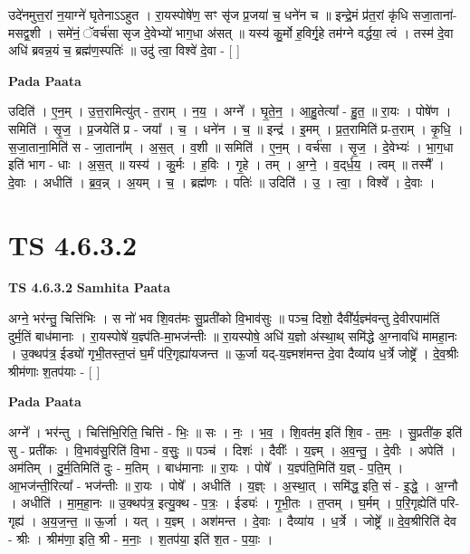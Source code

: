 \documentclass[17pt]{extarticle}
\begin{document}
उदे॑नमुत्त॒रां न॒याग्ने॑ घृतेनाऽऽहुत । रा॒यस्पोषे॑ण॒ सꣳ सृ॑ज प्र॒जया॑ च॒ धने॑न च ॥ इन्द्रे॒मं प्र॑त॒रां कृ॑धि सजा॒ताना॑-मसद्व॒शी । समे॑नं॒ ॅवर्च॑सा सृज दे॒वेभ्यो॑ भाग॒धा अ॑सत् ॥ यस्य॑ कु॒र्मो ह॒विर्गृ॒हे तम॑ग्ने वर्द्धया॒ त्वं । तस्म॑ दे॒वा अधि॑ ब्रवन्न॒यं च॒ ब्रह्म॑ण॒स्पतिः॑ ॥ उदु॑ त्वा॒ विश्वे॑ दे॒वा - [  ] \newline

\textbf{Pada Paata} \newline

उदिति॑ । ए॒न॒म् । उ॒त्त॒रामित्यु॑त् - त॒राम् । न॒य॒ । अग्ने᳚ । घृ॒ते॒न॒ । आ॒हु॒तेत्या᳚ - हु॒त॒ ॥ रा॒यः । पोषे॑ण । समिति॑ । सृ॒ज॒ । प्र॒जयेति॑ प्र - जया᳚ । च॒ । धने॑न । च॒ ॥ इन्द्र॑ । इ॒मम् । प्र॒त॒रामिति॑ प्र-त॒राम् । कृ॒धि॒ । स॒जा॒ताना॒मिति॑ स - जा॒ताना᳚म् । अ॒स॒त् । व॒शी ॥ समिति॑ । ए॒न॒म् । वर्च॑सा । सृ॒ज॒ । दे॒वेभ्यः॑ । भा॒ग॒धा इति॑ भाग - धाः । अ॒स॒त् ॥ यस्य॑ । कु॒र्मः । ह॒विः । गृ॒हे । तम् । अ॒ग्ने॒ । व॒द्‌र्ध॒य॒ । त्वम् ॥ तस्मै᳚ । दे॒वाः । अधीति॑ । ब्र॒व॒न्न् । अ॒यम् । च॒ । ब्रह्म॑णः । पतिः॑ ॥ उदिति॑ । उ॒ । त्वा॒ । विश्वे᳚ । दे॒वाः ।  \newline





\section{ TS 4.6.3.2 }

\textbf{TS 4.6.3.2 } \newline
\textbf{Samhita Paata} \newline

अग्ने॒ भर॑न्तु॒ चित्ति॑भिः । स नो॑ भव शि॒वत॑मः सु॒प्रती॑को वि॒भाव॑सुः ॥ पञ्च॒ दिशो॒ दैवी᳚र्य॒ज्ञ्म॑वन्तु दे॒वीरपाम॑तिं दुर्म॒तिं बाध॑मानाः । रा॒यस्पोषे॑ य॒ज्ञ्प॑ति-मा॒भज॑न्तीः ॥ रा॒यस्पोषे॒ अधि॑ य॒ज्ञो अ॑स्था॒थ् समि॑द्धे अ॒ग्नावधि॑ मामहा॒नः । उ॒क्थप॑त्र॒ ईड्यो॑ गृभी॒तस्त॒प्तं घ॒र्मं प॑रि॒गृह्या॑यजन्त ॥ ऊ॒र्जा यद्-य॒ज्ञ्मश॑मन्त दे॒वा दैव्या॑य ध॒र्त्रे जोष्ट्रे᳚ । दे॒व॒श्रीः श्रीम॑णाः श॒तप॑याः - [  ] \newline

\textbf{Pada Paata} \newline

अग्ने᳚ । भर॑न्तु । चित्ति॑भि॒रिति॒ चित्ति॑ - भिः॒ ॥ सः । नः॒ । भ॒व॒ । शि॒वत॑म॒ इति॑ शि॒व - त॒मः॒ । सु॒प्रती॑क॒ इति॑ सु - प्रती॑कः । वि॒भाव॑सु॒रिति॑ वि॒भा - व॒सुः॒ ॥ पञ्च॑ । दिशः॑ । दैवीः᳚ । य॒ज्ञ्म् । अ॒व॒न्तु॒ । दे॒वीः । अपेति॑ । अम॑तिम् । दु॒र्म॒तिमिति॑ दुः - म॒तिम् । बाध॑मानाः ॥ रा॒यः । पोषे᳚ । य॒ज्ञ्प॑ति॒मिति॑ य॒ज्ञ् - प॒ति॒म् । आ॒भज॑न्ती॒रित्या᳚ - भज॑न्तीः ॥ रा॒यः । पोषे᳚ । अधीति॑ । य॒ज्ञ्ः । अ॒स्था॒त् । समि॑द्ध॒ इति॒ सं - इ॒द्धे॒ । अ॒ग्नौ । अधीति॑ । मा॒म॒हा॒नः ॥ उ॒क्थप॑त्र॒ इत्यु॒क्थ - प॒त्रः॒ । ईड्यः॑ । गृ॒भी॒तः । त॒प्तम् । घ॒र्मम् । प॒रि॒गृह्येति॑ परि-गृह्य॑ । अ॒य॒ज॒न्त॒ ॥ ऊ॒र्जा । यत् । य॒ज्ञ्म् । अश॑मन्त । दे॒वाः । दैव्या॑य । ध॒र्त्रे । जोष्ट्रे᳚ ॥ दे॒व॒श्रीरिति॑ देव - श्रीः । श्रीम॑णा॒ इति॒ श्री - म॒नाः॒ । श॒तप॑या॒ इति॑ श॒त - प॒याः॒ ।  \newline
\end{document}
